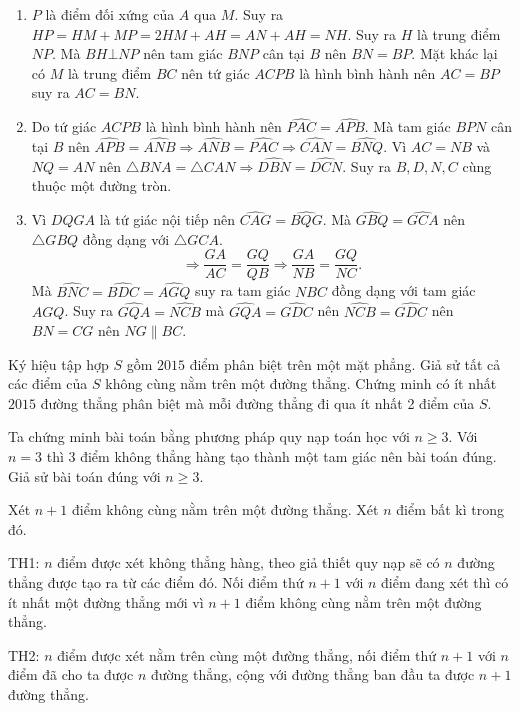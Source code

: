 \begin{ex}
{
    \begin{enumerate}
        \item $P$ là điểm đối xứng của $A$ qua $M$. Suy ra $HP=HM+MP=2HM+AH=AN+AH=NH$. Suy ra $H$ là trung điểm $NP$. Mà $BH\bot NP$ nên tam giác $BNP$ cân tại $B$ nên $BN=BP$. Mặt khác lại có $M$ là trung điểm $BC$ nên tứ giác $ACPB$ là hình bình hành nên $AC=BP$ suy ra $AC=BN$.
        \item Do tứ giác $ACPB$ là hình bình hành nên $\widehat{PAC}=\widehat{APB}$. Mà tam giác $BPN$ cân tại $B$ nên $\widehat{APB}=\widehat{ANB}\Rightarrow \widehat{ANB}=\widehat{PAC}\Rightarrow \widehat{CAN}=\widehat{BNQ}$.
        Vì $AC=NB$ và $NQ=AN$ nên $\triangle BNA=\triangle CAN\Rightarrow \widehat{DBN}=\widehat{DCN}$. Suy ra $B,D,N,C$ cùng thuộc một đường tròn. 
        \item Vì $DQGA$ là tứ giác nội tiếp nên $\widehat{CAG}=\widehat{BQG}$. Mà $\widehat{GBQ}=\widehat{GCA}$ nên $\triangle GBQ$ đồng dạng với $\triangle GCA$.
        $$\Rightarrow \frac{GA}{AC}=\frac{GQ}{QB}\Rightarrow \frac{GA}{NB}=\frac{GQ}{NC}.$$
        Mà $\widehat{BNC}=\widehat{BDC}=\widehat{AGQ}$ suy ra tam giác $NBC$ đồng dạng với tam giác $AGQ$.
        Suy ra $\widehat{GQA}=\widehat{NCB}$ mà $\widehat{GQA}=\widehat{GDC}$ nên $\widehat{NCB}=\widehat{GDC}$ nên $BN=CG$ nên $NG\parallel BC$.
    \end{enumerate}
    }
\end{ex}

\begin{ex}%
    Ký hiệu tập hợp $S$ gồm $2015$ điểm phân biệt trên một mặt phẳng. Giả sử tất cả các điểm của $S$ không cùng nằm trên một đường thẳng. Chứng minh có ít nhất $2015$ đường thẳng phân biệt mà mỗi đường thẳng đi qua ít nhất 2 điểm của $S$.
\loigiai
    {
   

   Ta chứng minh bài toán bằng phương pháp quy nạp toán học với $n\geq 3$.
   Với $n=3$ thì $3$ điểm không thẳng hàng tạo thành một tam giác nên bài toán đúng.
   Giả sử bài toán đúng với $n\geq 3$.
   
   Xét $n+1$ điểm không cùng nằm trên một đường thẳng. Xét $n$ điểm bất kì trong đó.
   
   TH1: $n$ điểm được xét không thẳng hàng, theo giả thiết quy nạp sẽ có $n$ đường thẳng được tạo ra từ các điểm đó. Nối điểm thứ $n+1$ với $n$ điểm đang xét thì có ít nhất một đường thẳng mới vì $n+1$ điểm không cùng nằm trên một đường thẳng.
   
   TH2: $n$ điểm được xét nằm trên cùng một đường thẳng, nối điểm thứ $n+1$ với $n$ điểm đã cho ta được $n$ đường thẳng, cộng với đường thẳng ban đầu ta được $n+1$ đường thẳng.
   
     }
\end{ex}


